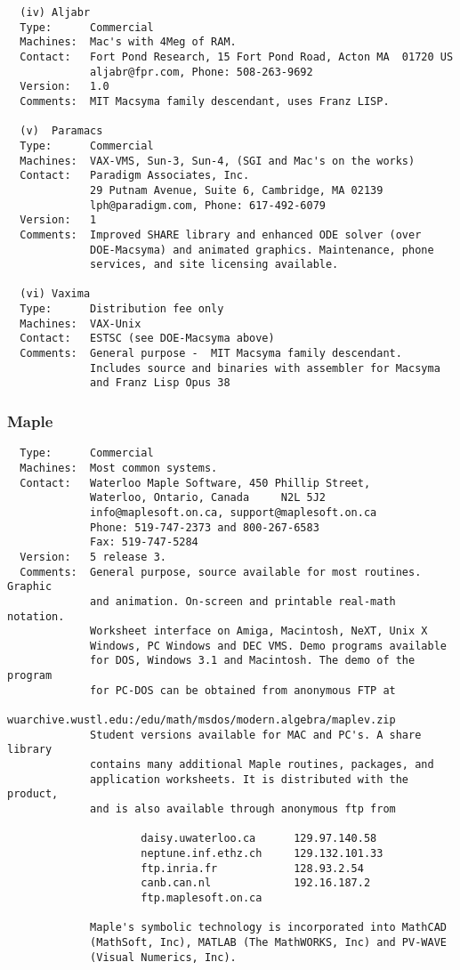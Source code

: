 \documentclass[twoside,11pt]{article}
\begin{document}
\begin{verbatim}
  (iv) Aljabr
  Type:      Commercial
  Machines:  Mac's with 4Meg of RAM.
  Contact:   Fort Pond Research, 15 Fort Pond Road, Acton MA  01720 US
             aljabr@fpr.com, Phone: 508-263-9692
  Version:   1.0
  Comments:  MIT Macsyma family descendant, uses Franz LISP.

  (v)  Paramacs
  Type:      Commercial
  Machines:  VAX-VMS, Sun-3, Sun-4, (SGI and Mac's on the works)
  Contact:   Paradigm Associates, Inc.
             29 Putnam Avenue, Suite 6, Cambridge, MA 02139
             lph@paradigm.com, Phone: 617-492-6079
  Version:   1
  Comments:  Improved SHARE library and enhanced ODE solver (over
             DOE-Macsyma) and animated graphics. Maintenance, phone
             services, and site licensing available.

  (vi) Vaxima
  Type:      Distribution fee only
  Machines:  VAX-Unix
  Contact:   ESTSC (see DOE-Macsyma above)
  Comments:  General purpose -  MIT Macsyma family descendant.
             Includes source and binaries with assembler for Macsyma
             and Franz Lisp Opus 38
\end{verbatim}

\subsubsection{Maple}
\begin{verbatim}
  Type:      Commercial
  Machines:  Most common systems.
  Contact:   Waterloo Maple Software, 450 Phillip Street,
             Waterloo, Ontario, Canada     N2L 5J2
             info@maplesoft.on.ca, support@maplesoft.on.ca
             Phone: 519-747-2373 and 800-267-6583
             Fax: 519-747-5284
  Version:   5 release 3.
  Comments:  General purpose, source available for most routines. Graphic
             and animation. On-screen and printable real-math notation.
             Worksheet interface on Amiga, Macintosh, NeXT, Unix X
             Windows, PC Windows and DEC VMS. Demo programs available
             for DOS, Windows 3.1 and Macintosh. The demo of the program
             for PC-DOS can be obtained from anonymous FTP at
             wuarchive.wustl.edu:/edu/math/msdos/modern.algebra/maplev.zip
             Student versions available for MAC and PC's. A share library
             contains many additional Maple routines, packages, and
             application worksheets. It is distributed with the product,
             and is also available through anonymous ftp from

                     daisy.uwaterloo.ca      129.97.140.58
                     neptune.inf.ethz.ch     129.132.101.33
                     ftp.inria.fr            128.93.2.54
                     canb.can.nl             192.16.187.2
                     ftp.maplesoft.on.ca

             Maple's symbolic technology is incorporated into MathCAD
             (MathSoft, Inc), MATLAB (The MathWORKS, Inc) and PV-WAVE
             (Visual Numerics, Inc).
\end{verbatim}
\end{document}

